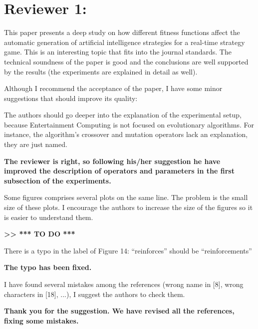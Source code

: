 \documentclass{article}
\begin{document}
\section{Reviewer 1:}

This paper presents a deep study on how different fitness functions affect the automatic generation of artificial intelligence strategies for a real-time strategy game. This is an interesting topic that fits into the journal standards. The technical soundness of the paper is good and the conclusions are well supported by the results (the experiments are explained in detail as well).

Although I recommend the acceptance of the paper, I have some minor suggestions that should improve its quality:

The authors should go deeper into the explanation of the experimental setup, because Entertainment Computing is not focused on evolutionary algorithms. For instance, the algorithm's crossover and mutation operators lack an explanation, they are just named.

\vspace{0.5cm} \textbf{The reviewer is right, so following his/her suggestion he have improved the description of operators and parameters in the first subsection of the experiments.} \vspace{0.5cm}

Some figures comprises several plots on the same line. The problem is the small size of these plots. I encourage the authors to increase the size of the figures so it is easier to understand them.

\vspace{0.5cm} \textbf{>> *** TO DO ***} \vspace{0.5cm}

There is a typo in the label of Figure 14: ``reinforces'' should be ``reinforcements''

\vspace{0.5cm} \textbf{The typo has been fixed.} \vspace{0.5cm}

I have found several mistakes among the references (wrong name in [8], wrong characters in [18], ...), I suggest the authors to check them.

\vspace{0.5cm} \textbf{Thank you for the suggestion. We have revised all the references, fixing some mistakes.} \vspace{0.5cm}
\end{document}
